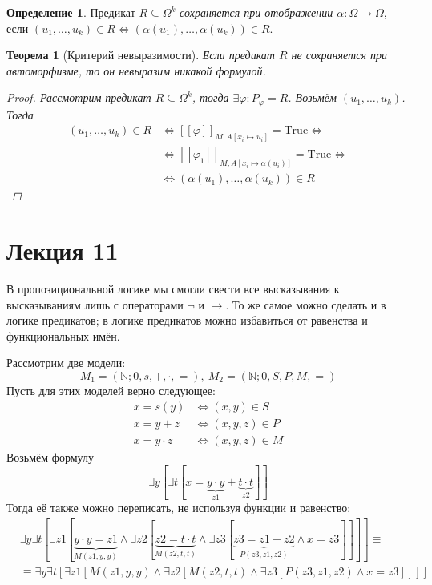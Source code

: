 \documentclass[12pt]{article}
\let\im\rightarrow
\let\eq\equiv
\let\n\neg
\let\sus\subseteq
\let\m\cdot
\def\NN{\mathbb{N}}
\theoremstyle{definition}
\newtheorem{definition}{Определение}[section]
\theoremstyle{plain}
\newtheorem{theorem}{Теорема}[section]
\theoremstyle{remark}
\begin{document}
\begin{definition}
  Предикат $R \sus \Omega^k$ \textit{сохраняется при отображении
  $\alpha \colon \Omega \to \Omega$}, если $(u_1, \dots, u_k) \in R
  \iff (\alpha(u_1), \dots, \alpha(u_k)) \in R$.
\end{definition}

\begin{theorem}[Критерий невыразимости]
  Если предикат $R$ не сохраняется при автоморфизме, то он невыразим
  никакой формулой.
  \begin{proof}
    Рассмотрим предикат $R \sus \Omega^k$, тогда $\exists \varphi
    \colon P_{\varphi} = R$. Возьмём $(u_1, \dots, u_k)$. Тогда
    \begin{align*}
      (u_1, \dots, u_k) \in R &\iff
      [[\varphi]]_{M,A[x_i \mapsto u_i]} = \mathrm{True} \iff\\&\iff
      [[\varphi_1]]_{M,A[x_i \mapsto \alpha(u_i)]} = \mathrm{True} \iff\\&\iff
      (\alpha(u_1), \dots, \alpha(u_k)) \in R
    \end{align*}
  \end{proof}
\end{theorem}

\pagebreak

\section{Лекция 11}

В пропозициональной логике мы смогли свести все высказывания к
высказываниям лишь с операторами $\n$ и $\im$. То же самое можно
сделать и в логике предикатов; в логике предикатов можно избавиться
от равенства и функциональных имён.

Рассмотрим две модели:
\[
  M_1 = (\NN; 0, s, +, \m, =),\ M_2 = (\NN; 0, S, P, M, =)
\]
Пусть для этих моделей верно следующее:
\begin{align*}
  x = s(y) &\iff (x, y) \in S\\
  x = y + z &\iff (x, y, z) \in P\\
  x = y \m z &\iff (x, y, z) \in M
\end{align*}
Возьмём формулу
\[
  \exists y [\exists t [x = \underbrace{y \m y}_{z1} + \underbrace{t
  \m t}_{z2}]]
\]
Тогда её также можно переписать, не используя функции и равенство:
\begin{align*}
  &\exists y \exists t [\exists z1 [\underbrace{y \m y = z1}_{M(z1, y,
      y)} \land \exists z2 [\underbrace{z2 = t \m t}_{M(z2, t, t)}
        \land \exists z3 [\underbrace{z3 = z1 + z2}_{P(z3, z1, z2)} \land x
  = z3]]]] \eq\\&\eq
  \exists y \exists t [\exists z1 [M(z1, y, y) \land \exists z2
  [M(z2, t, t) \land \exists z3 [P(z3, z1, z2) \land x = z3]]]]
\end{align*}
\end{document}
